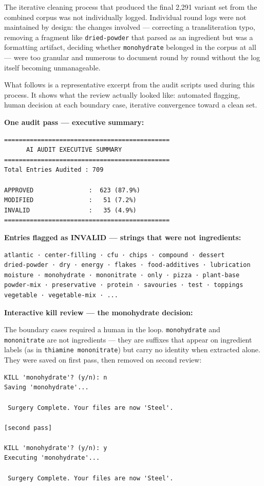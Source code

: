 \documentclass[
  letterpaper,
  DIV=11,
  numbers=noendperiod]{scrartcl}
\begin{document}
The iterative cleaning process that produced the final 2,291 variant set
from the combined corpus was not individually logged. Individual round
logs were not maintained by design: the changes involved --- correcting
a transliteration typo, removing a fragment like \texttt{dried-powder}
that parsed as an ingredient but was a formatting artifact, deciding
whether \texttt{monohydrate} belonged in the corpus at all --- were too
granular and numerous to document round by round without the log itself
becoming unmanageable.

What follows is a representative excerpt from the audit scripts used
during this process. It shows what the review actually looked like:
automated flagging, human decision at each boundary case, iterative
convergence toward a clean set.

\textbf{One audit pass --- executive summary:}

\begin{verbatim}
=============================================
      AI AUDIT EXECUTIVE SUMMARY
=============================================
Total Entries Audited : 709

APPROVED               :  623 (87.9%)
MODIFIED               :   51 (7.2%)
INVALID                :   35 (4.9%)
=============================================
\end{verbatim}

\textbf{Entries flagged as INVALID --- strings that were not
ingredients:}

\begin{verbatim}
atlantic · center-filling · cfu · chips · compound · dessert
dried-powder · dry · energy · flakes · food-additives · lubrication
moisture · monohydrate · mononitrate · only · pizza · plant-base
powder-mix · preservative · protein · savouries · test · toppings
vegetable · vegetable-mix · ...
\end{verbatim}

\textbf{Interactive kill review --- the monohydrate decision:}

The boundary cases required a human in the loop. \texttt{monohydrate}
and \texttt{mononitrate} are not ingredients --- they are suffixes that
appear on ingredient labels (as in \texttt{thiamine\ mononitrate}) but
carry no identity when extracted alone. They were saved on first pass,
then removed on second review:

\begin{verbatim}
KILL 'monohydrate'? (y/n): n
Saving 'monohydrate'...

 Surgery Complete. Your files are now 'Steel'. 

[second pass]

KILL 'monohydrate'? (y/n): y
Executing 'monohydrate'...

 Surgery Complete. Your files are now 'Steel'. 
\end{verbatim}
\end{document}

